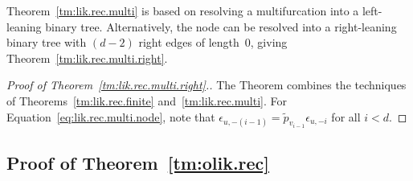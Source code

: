 \documentclass{elsarticle}
\newcommand{\nx}{u}
\newcommand{\ny}{v}
\begin{document}
Theorem~\ref{tm:lik.rec.multi} is based on resolving a multifurcation into a left-leaning 
binary tree. Alternatively, the node can be resolved into a right-leaning binary tree with 
$(d-2)$ right edges of length~0, giving Theorem~\ref{tm:lik.rec.multi.right}. 


\begin{proof}[Proof of Theorem~\ref{tm:lik.rec.multi.right}.]
The Theorem combines the techniques of Theorems~\ref{tm:lik.rec.finite} and~\ref{tm:lik.rec.multi}. 
For Equation~\eqref{eq:lik.rec.multi.node}, note 
that $\epsilon_{\nx,-(i-1)} = \tilde{p}_{\ny_{i-1}}\epsilon_{\nx,-i}$ for all $i<d$. 
\end{proof}

\subsection{Proof of Theorem~\ref{tm:olik.rec}}
\end{document}
